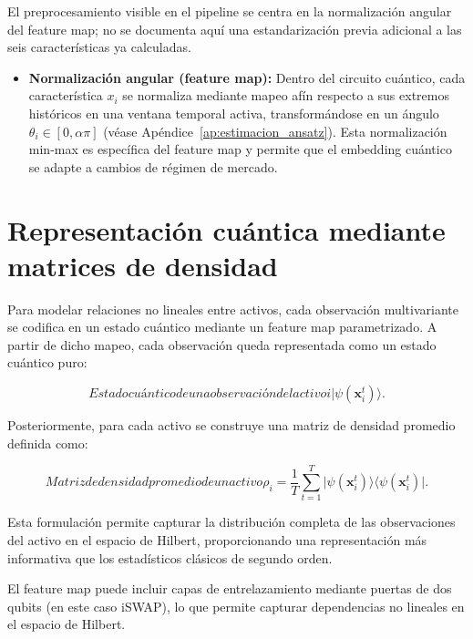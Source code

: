 El preprocesamiento visible en el pipeline se centra en la normalización angular del feature map; no se documenta aquí una estandarización previa adicional a las seis características ya calculadas.

\begin{itemize}
\item \textbf{Normalización angular (feature map):} Dentro del circuito cuántico, cada característica $x_i$ se normaliza mediante mapeo afín respecto a sus extremos históricos en una ventana temporal activa, transformándose en un ángulo $\theta_i \in [0, \alpha\pi]$ (véase Apéndice~\ref{ap:estimacion_ansatz}). Esta normalización min-max es específica del feature map y permite que el embedding cuántico se adapte a cambios de régimen de mercado.
\end{itemize}


\section{Representación cuántica mediante matrices de densidad}
\label{sec:representacion_cuantica}
Para modelar relaciones no lineales entre activos, cada observación multivariante se codifica en un estado cuántico mediante un feature map parametrizado. A partir de dicho mapeo, cada observación queda representada como un estado cuántico puro:

\begin{equation}[eq:estado_cuantico_observacion]{Estado cuántico de una observación del activo i}
\lvert\psi(\mathbf{x}_i^t)\rangle.
\end{equation}

Posteriormente, para cada activo se construye una matriz de densidad promedio definida como:

\begin{equation}[eq:matriz_densidad_promedio]{Matriz de densidad promedio de un activo}
\rho_i = \frac{1}{T} \sum_{t=1}^{T}
\lvert\psi(\mathbf{x}_i^t)\rangle\langle\psi(\mathbf{x}_i^t)\rvert.
\end{equation}

Esta formulación permite capturar la distribución completa de las observaciones del activo en el espacio de Hilbert, proporcionando una representación más informativa que los estadísticos clásicos de segundo orden.

El feature map puede incluir capas de entrelazamiento mediante puertas de dos qubits (en este caso iSWAP), lo que permite capturar dependencias no lineales en el espacio de Hilbert.

